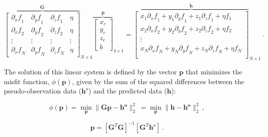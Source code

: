     \begin{equation}
    {\overbrace{
    \begin{bmatrix}
      {\partial_x f}_1 & {\partial_y f}_1 & {\partial_z f}_1 & \eta \\
      {\partial_x f}_2 & {\partial_y f}_2 & {\partial_z f}_2 & \eta \\
      \vdots & \vdots & \vdots & \vdots \\
      {\partial_x f}_N & {\partial_y f}_N & {\partial_z f}_N & \eta
    \end{bmatrix}
    }^{\mathbf{G}}}_{N \times 4}
    {\overbrace{
    \begin{bmatrix}
      x_c \\ y_c \\ z_c \\ b
    \end{bmatrix}
    }^{\mathbf{p}}}_{4 \times 1}
    =
    {\overbrace{
    \begin{bmatrix}
      x_1 {\partial_x f}_1 + y_1 {\partial_y f}_1 + z_1 {\partial_z f}_1 + \eta f_1 \\
      x_2 {\partial_x f}_2 + y_2 {\partial_y f}_2 + z_2 {\partial_z f}_2 + \eta f_2 \\
      \vdots \\
      x_N {\partial_x f}_N + y_N {\partial_y f}_N + z_N {\partial_z f}_N + \eta f_N \\
    \end{bmatrix}
    }^{\mathbf{h}}}_{N \times 1}
    \ .
    \end{equation}
    
    The solution of this linear system is defined by the vector $\mathbf{p}$ that minimizes the misfit function, $\phi(\mathbf{p})$, given by the sum of the squared differences between the pseudo-observation data ($\mathbf{h}^o$) and the predicted data ($\mathbf{h}$):
    
    \begin{equation}
    \label{function_phi}
    \phi(\mathbf{p}) = \min_{\mathbf{p}} \| \mathbf{G}\mathbf{p} - \mathbf{\mathbf{h}^o} \|_2^2\ = \min_{\mathbf{p}} \| \mathbf{h} - \mathbf{\mathbf{h}^o} \|_2^2\
    ,
    \end{equation}
    
    
    \begin{equation}
    \label{euler_solution}
    \mathbf{p} = {[\mathbf{G}^T \mathbf{G}]}^{-1} [\mathbf{G}^T \mathbf{h}^o]\ .
    \end{equation}
    
